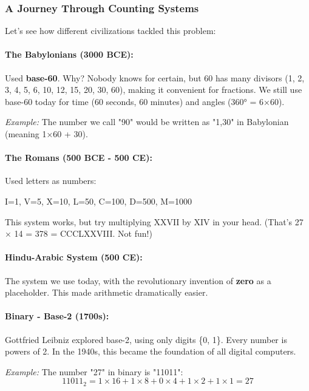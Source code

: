 \subsubsection*{A Journey Through Counting Systems}

Let's see how different civilizations tackled this problem:

\paragraph{The Babylonians (3000 BCE):} Used \textbf{base-60}. Why? Nobody knows for certain, but 60 has many divisors (1, 2, 3, 4, 5, 6, 10, 12, 15, 20, 30, 60), making it convenient for fractions. We still use base-60 today for time (60 seconds, 60 minutes) and angles (360° = 6×60).

\textit{Example:} The number we call "90" would be written as "1,30" in Babylonian (meaning 1×60 + 30).

\paragraph{The Romans (500 BCE - 500 CE):} Used letters as numbers:
\begin{center}
I=1, \quad V=5, \quad X=10, \quad L=50, \quad C=100, \quad D=500, \quad M=1000
\end{center}

This system works, but try multiplying XXVII by XIV in your head. (That's 27 × 14 = 378 = CCCLXXVIII. Not fun!)

\paragraph{Hindu-Arabic System (500 CE):} The system we use today, with the revolutionary invention of \textbf{zero} as a placeholder. This made arithmetic dramatically easier.

\paragraph{Binary - Base-2 (1700s):} Gottfried Leibniz explored base-2, using only digits \{0, 1\}. Every number is powers of 2. In the 1940s, this became the foundation of all digital computers.

\textit{Example:} The number "27" in binary is "11011":
\begin{equation}
11011_2 = 1\times 16 + 1\times 8 + 0\times 4 + 1\times 2 + 1\times 1 = 27
\end{equation}

